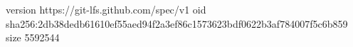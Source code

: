 version https://git-lfs.github.com/spec/v1
oid sha256:2db38dedb61610ef55aed94f2a3ef86c1573623bdf0622b3af784007f5c6b859
size 5592544
